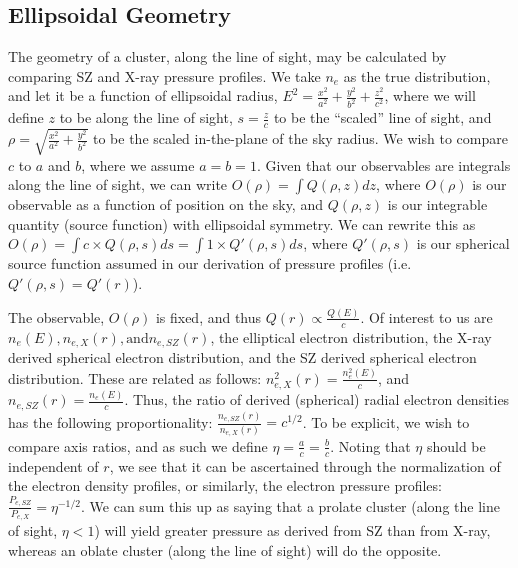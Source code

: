 \documentclass[iop,numberedappendix,apj]{emulateapj}
\begin{document}
\subsection{Ellipsoidal Geometry}
\label{sec:ellgeo}

The geometry of a cluster, along the line of sight, may be calculated by comparing SZ and
X-ray pressure profiles. We take $n_e$ as the true distribution, and let 
it be a function of ellipsoidal radius, $E^2 = \frac{x^2}{a^2} + \frac{y^2}{b^2} + \frac{z^2}{c^2}$, 
where we will define $z$ to be along the line of sight, $s = \frac{z}{c}$ to be the ``scaled'' line of sight,
and $\rho = \sqrt{\frac{x^2}{a^2} + \frac{y^2}{b^2}}$ to be the scaled in-the-plane of the sky radius.
We wish to compare $c$ to $a$ and $b$, where we assume $a=b=1$. Given that our observables
are integrals along the line of sight, we can write $O(\rho) = \int Q(\rho, z) dz$, where
 $O(\rho)$ is our observable as a function of position on the sky, and $Q(\rho, z)$ is our
integrable quantity (source function) with ellipsoidal symmetry. We can rewrite this as 
$O(\rho) = \int c \times Q(\rho, s) ds = \int 1 \times Q\prime(\rho, s) ds$, where $Q\prime(\rho, s)$
is our spherical source function assumed in our derivation of pressure profiles (i.e. 
$Q\prime(\rho, s) = Q\prime(r)$).

The observable, $O(\rho)$ is fixed, and thus $Q(r) \propto \frac{Q(E)}{c}$. Of interest to us are 
$n_e(E), n_{e,X}(r), \text{and} n_{e,SZ}(r)$, the elliptical electron distribution, the X-ray derived spherical
electron distribution, and the SZ derived spherical electron distribution. 
These are related as follows: $n_{e,X}^2(r) = \frac{n_e^2(E)}{c}$, and $n_{e,SZ}(r) = \frac{n_e(E)}{c}$.
Thus, the ratio of derived (spherical) radial electron densities has the following proportionality:
$\frac{n_{e,SZ}(r)}{n_{e,X}(r)} = c^{1/2}$. To be explicit, we wish to compare axis ratios, and as such
we define $\eta = \frac{a}{c} = \frac{b}{c}$. Noting that $\eta$ should be independent of $r$,
we see that it can be ascertained through the normalization of the electron density profiles,
or similarly, the electron pressure profiles: $\frac{P_{e,SZ}}{P_{e,X}} = \eta^{-1/2}$. 
We can sum this up as saying that a prolate cluster (along
the line of sight, $\eta < 1$) will yield greater pressure as derived from SZ than from X-ray,
whereas an oblate cluster (along the line of sight) will do the opposite.
\end{document}
